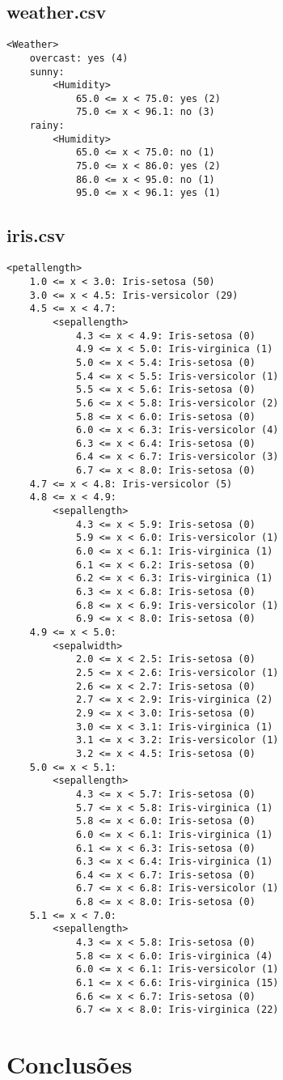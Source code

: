 \documentclass[12pt,a4paper]{article}
\begin{document}
\subsection{weather.csv}
\begin{lstlisting}
<Weather>
	overcast: yes (4)
	sunny:
		<Humidity>
			65.0 <= x < 75.0: yes (2)
			75.0 <= x < 96.1: no (3)
	rainy:
		<Humidity>
			65.0 <= x < 75.0: no (1)
			75.0 <= x < 86.0: yes (2)
			86.0 <= x < 95.0: no (1)
			95.0 <= x < 96.1: yes (1)
\end{lstlisting}

\subsection{iris.csv}
\begin{lstlisting}
<petallength>
	1.0 <= x < 3.0: Iris-setosa (50)
	3.0 <= x < 4.5: Iris-versicolor (29)
	4.5 <= x < 4.7:
		<sepallength>
			4.3 <= x < 4.9: Iris-setosa (0)
			4.9 <= x < 5.0: Iris-virginica (1)
			5.0 <= x < 5.4: Iris-setosa (0)
			5.4 <= x < 5.5: Iris-versicolor (1)
			5.5 <= x < 5.6: Iris-setosa (0)
			5.6 <= x < 5.8: Iris-versicolor (2)
			5.8 <= x < 6.0: Iris-setosa (0)
			6.0 <= x < 6.3: Iris-versicolor (4)
			6.3 <= x < 6.4: Iris-setosa (0)
			6.4 <= x < 6.7: Iris-versicolor (3)
			6.7 <= x < 8.0: Iris-setosa (0)
	4.7 <= x < 4.8: Iris-versicolor (5)
	4.8 <= x < 4.9:
		<sepallength>
			4.3 <= x < 5.9: Iris-setosa (0)
			5.9 <= x < 6.0: Iris-versicolor (1)
			6.0 <= x < 6.1: Iris-virginica (1)
			6.1 <= x < 6.2: Iris-setosa (0)
			6.2 <= x < 6.3: Iris-virginica (1)
			6.3 <= x < 6.8: Iris-setosa (0)
			6.8 <= x < 6.9: Iris-versicolor (1)
			6.9 <= x < 8.0: Iris-setosa (0)
	4.9 <= x < 5.0:
		<sepalwidth>
			2.0 <= x < 2.5: Iris-setosa (0)
			2.5 <= x < 2.6: Iris-versicolor (1)
			2.6 <= x < 2.7: Iris-setosa (0)
			2.7 <= x < 2.9: Iris-virginica (2)
			2.9 <= x < 3.0: Iris-setosa (0)
			3.0 <= x < 3.1: Iris-virginica (1)
			3.1 <= x < 3.2: Iris-versicolor (1)
			3.2 <= x < 4.5: Iris-setosa (0)
	5.0 <= x < 5.1:
		<sepallength>
			4.3 <= x < 5.7: Iris-setosa (0)
			5.7 <= x < 5.8: Iris-virginica (1)
			5.8 <= x < 6.0: Iris-setosa (0)
			6.0 <= x < 6.1: Iris-virginica (1)
			6.1 <= x < 6.3: Iris-setosa (0)
			6.3 <= x < 6.4: Iris-virginica (1)
			6.4 <= x < 6.7: Iris-setosa (0)
			6.7 <= x < 6.8: Iris-versicolor (1)
			6.8 <= x < 8.0: Iris-setosa (0)
	5.1 <= x < 7.0:
		<sepallength>
			4.3 <= x < 5.8: Iris-setosa (0)
			5.8 <= x < 6.0: Iris-virginica (4)
			6.0 <= x < 6.1: Iris-versicolor (1)
			6.1 <= x < 6.6: Iris-virginica (15)
			6.6 <= x < 6.7: Iris-setosa (0)
			6.7 <= x < 8.0: Iris-virginica (22)
\end{lstlisting}

\section{Conclusões}


 
\end{document}
